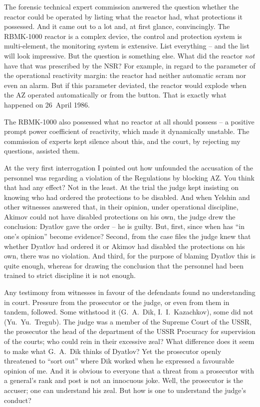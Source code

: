 \documentclass[openright]{bookest}
\begin{document}
The forensic technical expert commission answered the question whether the reactor could be operated by listing what the reactor had, what protections it possessed. And it came out to a lot and, at first glance, convincingly. The RBMK-1000 reactor is a complex device, the control and protection system is multi-element, the monitoring system is extensive. List everything -- and the list will look impressive. But the question is something else. What did the reactor \textit{not} have that was prescribed by the NSR? For example, in regard to the parameter of the operational reactivity margin: the reactor had neither automatic scram nor even an alarm. But if this parameter deviated, the reactor would explode when the AZ operated automatically or from the button. That is exactly what happened on 26~April 1986.

The RBMK-1000 also possessed what no reactor at all should possess -- a positive prompt power coefficient of reactivity, which made it dynamically unstable. The commission of experts kept silence about this, and the court, by rejecting my questions, assisted them.

At the very first interrogation I pointed out how unfounded the accusation of the personnel was regarding a violation of the Regulations by blocking AZ. You think that had any effect? Not in the least. At the trial the judge kept insisting on knowing who had ordered the protections to be disabled. And when Yelshin and other witnesses answered that, in their opinion, under operational discipline, Akimov could not have disabled protections on his own, the judge drew the conclusion: Dyatlov gave the order -- he is guilty. But, first, since when has ``in one's opinion'' become evidence? Second, from the case files the judge knew that whether Dyatlov had ordered it or Akimov had disabled the protections on his own, there was no violation. And third, for the purpose of blaming Dyatlov this is quite enough, whereas for drawing the conclusion that the personnel had been trained to strict discipline it is not enough.


Any testimony from witnesses in favour of the defendants found no understanding in court. Pressure from the prosecutor or the judge, or even from them in tandem, followed. Some withstood it (G.~A.~Dik, I.~I.~Kazachkov), some did not (Yu.~Yu.~Tregub). The judge was a member of the Supreme Court of the USSR, the prosecutor the head of the department of the USSR Procuracy for supervision of the courts; who could rein in their excessive zeal? What difference does it seem to make what G.~A.~Dik thinks of Dyatlov? Yet the prosecutor openly threatened to ``sort out'' where Dik worked when he expressed a favourable opinion of me. And it is obvious to everyone that a threat from a prosecutor with a general's rank and post is not an innocuous joke. Well, the prosecutor is the accuser; one can understand his zeal. But how is one to understand the judge's conduct?
\end{document}
